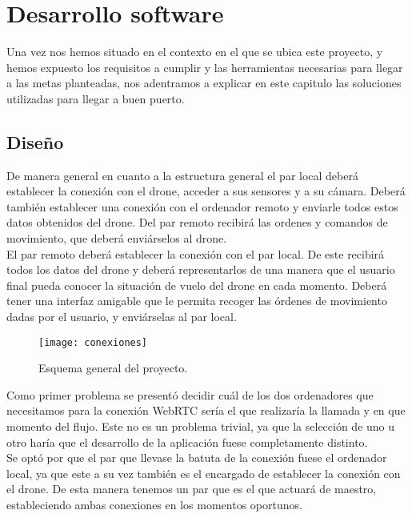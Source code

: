 \chapter{Desarrollo software}

Una vez nos hemos situado en el contexto en el que se ubica este proyecto, y hemos expuesto los requisitos a cumplir y las herramientas necesarias para llegar a las metas planteadas, nos adentramos a explicar en este capitulo las soluciones utilizadas para llegar a buen puerto.\\

\section{Diseño}

De manera general en cuanto a la estructura general el par local deberá establecer la conexión con el drone, acceder a sus sensores y a su cámara. Deberá también establecer una conexión con el ordenador remoto y enviarle todos estos datos obtenidos del drone. Del par remoto recibirá las ordenes y comandos de movimiento, que deberá enviárselos al drone.\\

El par remoto deberá establecer la conexión con el par local. De este recibirá todos los datos del drone y deberá representarlos de una manera que el usuario final pueda conocer la situación de vuelo del drone en cada momento. Deberá tener una interfaz amigable que le permita recoger las órdenes de movimiento dadas por el usuario, y enviárselas al par local.\\

\begin{figure}[h!]
\centering
\texttt{[image: conexiones]}
\caption{Esquema general del proyecto.}
\label{fig:esquemageneral}
\end{figure}

Como primer problema se presentó decidir cuál de los dos ordenadores que necesitamos para la conexión WebRTC sería el que realizaría la llamada y en que momento del flujo. Este no es un problema trivial, ya que la selección de uno u otro haría que el desarrollo de la aplicación fuese completamente distinto.\\

Se optó por que el par que llevase la batuta de la conexión fuese el ordenador local, ya que este a su vez también es el encargado de  establecer la conexión con el drone. De esta manera tenemos un par que es el que actuará de maestro, estableciendo ambas conexiones en los momentos oportunos.\\

